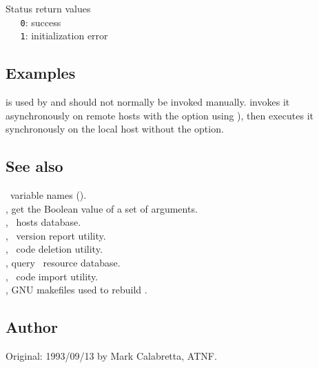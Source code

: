 Status return values
\\ \verb+   0+: success
\\ \verb+   1+: initialization error

\subsection*{Examples}

 is used by  and should not normally be invoked
manually.   invokes it asynchronously on remote hosts with the
 option using ), then executes it synchronously on
the local host without the  option.

\subsection*{See also}

\aipspp\ variable names ().\\
, get the Boolean value of a set of arguments.\\
, \aipspp\ hosts database.\\
, \aipspp\ version report utility.\\
, \aipspp\ code deletion utility.\\
, query \aipspp\ resource database.\\
, \aipspp\ code import utility.\\
, GNU makefiles used to rebuild \aipspp.

\subsection*{Author}

Original: 1993/09/13 by Mark Calabretta, ATNF.
